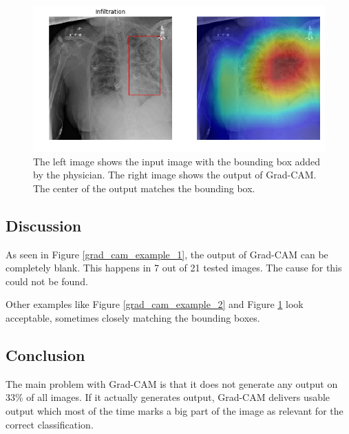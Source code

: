 \begin{figure}[H]
\centering
\includegraphics[width=12cm]{chapters/03_classification/images/grad-cam_8.png}
\caption{The left image shows the input image with the bounding box added by the physician. The right image shows the output of Grad-CAM. The center of the output matches the bounding box.}
\label{grad_cam_example_3}
\end{figure}

\subsection{Discussion}
As seen in Figure \ref{grad_cam_example_1}, the output of Grad-CAM can be completely blank. This happens in 7 out of 21 tested images. The cause for this could not be found.

Other examples like Figure \ref{grad_cam_example_2} and Figure \ref{grad_cam_example_3} look acceptable, sometimes closely matching the bounding boxes.

\subsection{Conclusion}
The main problem with Grad-CAM is that it does not generate any output on 33\% of all images. If it actually generates output, Grad-CAM delivers usable output which most of the time marks a big part of the image as relevant for the correct classification.
